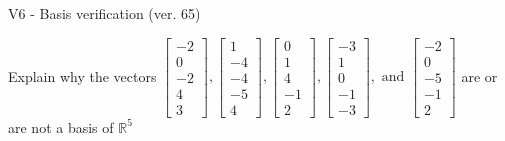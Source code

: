 \begin{exercise}
  \begin{exerciseTitle}V6 - Basis verification (ver. 65)\end{exerciseTitle}
  \begin{exerciseStatement}
    Explain why the vectors \(\left[\begin{array}{r}
-2 \\
0 \\
-2 \\
4 \\
3
\end{array}\right] , \left[\begin{array}{r}
1 \\
-4 \\
-4 \\
-5 \\
4
\end{array}\right] , \left[\begin{array}{r}
0 \\
1 \\
4 \\
-1 \\
2
\end{array}\right] , \left[\begin{array}{r}
-3 \\
1 \\
0 \\
-1 \\
-3
\end{array}\right] , \text{ and } \left[\begin{array}{r}
-2 \\
0 \\
-5 \\
-1 \\
2
\end{array}\right]\) are or are not a basis of \(\mathbb{R}^5\)	



\end{exerciseStatement}
\end{exercise}
